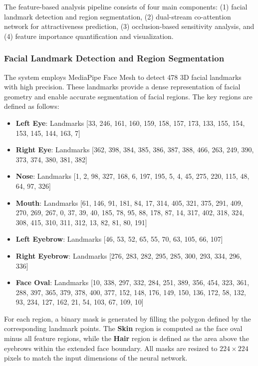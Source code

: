 The feature-based analysis pipeline consists of four main components: (1) facial landmark detection and region segmentation, (2) dual-stream co-attention network for attractiveness prediction, (3) occlusion-based sensitivity analysis, and (4) feature importance quantification and visualization.

\subsubsection{Facial Landmark Detection and Region Segmentation}

The system employs MediaPipe Face Mesh \cite{mediapipe} to detect 478 3D facial landmarks with high precision. These landmarks provide a dense representation of facial geometry and enable accurate segmentation of facial regions. The key regions are defined as follows:

\begin{itemize}
    \item \textbf{Left Eye}: Landmarks [33, 246, 161, 160, 159, 158, 157, 173, 133, 155, 154, 153, 145, 144, 163, 7]
    \item \textbf{Right Eye}: Landmarks [362, 398, 384, 385, 386, 387, 388, 466, 263, 249, 390, 373, 374, 380, 381, 382]
    \item \textbf{Nose}: Landmarks [1, 2, 98, 327, 168, 6, 197, 195, 5, 4, 45, 275, 220, 115, 48, 64, 97, 326]
    \item \textbf{Mouth}: Landmarks [61, 146, 91, 181, 84, 17, 314, 405, 321, 375, 291, 409, 270, 269, 267, 0, 37, 39, 40, 185, 78, 95, 88, 178, 87, 14, 317, 402, 318, 324, 308, 415, 310, 311, 312, 13, 82, 81, 80, 191]
    \item \textbf{Left Eyebrow}: Landmarks [46, 53, 52, 65, 55, 70, 63, 105, 66, 107]
    \item \textbf{Right Eyebrow}: Landmarks [276, 283, 282, 295, 285, 300, 293, 334, 296, 336]
    \item \textbf{Face Oval}: Landmarks [10, 338, 297, 332, 284, 251, 389, 356, 454, 323, 361, 288, 397, 365, 379, 378, 400, 377, 152, 148, 176, 149, 150, 136, 172, 58, 132, 93, 234, 127, 162, 21, 54, 103, 67, 109, 10]
\end{itemize}

For each region, a binary mask is generated by filling the polygon defined by the corresponding landmark points. The \textbf{Skin} region is computed as the face oval minus all feature regions, while the \textbf{Hair} region is defined as the area above the eyebrows within the extended face boundary. All masks are resized to $224 \times 224$ pixels to match the input dimensions of the neural network.

